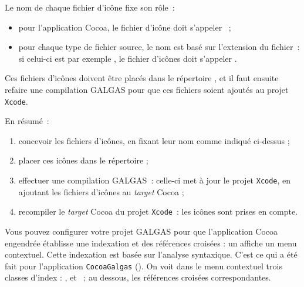 Le nom de chaque fichier d'icône fixe son rôle~:
\begin{itemize}
  \item pour l'application Cocoa, le fichier d'icône doit s'appeler ~;
  \item pour chaque type de fichier source, le nom est basé sur l'extension du fichier~: si celui-ci est par exemple , le fichier d'icônes doit s'appeler .
\end{itemize}

Ces fichiers d'icônes doivent être placés dans le répertoire , et il faut ensuite refaire une compilation GALGAS pour que ces fichiers soient ajoutés au projet \texttt{Xcode}.

En résumé~:
\begin{enumerate}
  \item concevoir les fichiers d'icônes, en fixant leur nom comme indiqué ci-dessus ;
  \item placer ces icônes dans le répertoire  ;
  \item effectuer une compilation GALGAS~: celle-ci met à jour le projet \texttt{Xcode}, en ajoutant les fichiers d'icônes au \emph{target} Cocoa ;
  \item recompiler le \emph{target} Cocoa du projet \texttt{Xcode}~: les icônes sont prises en compte.
\end{enumerate}














Vous pouvez configurer votre projet GALGAS pour que l'application Cocoa engendrée établisse une indexation et des références croisées : un  affiche un menu contextuel. Cette indexation est basée sur l'analyse syntaxique. C'est ce qui a été fait pour l'application \texttt{CocoaGalgas} (). On voit dans le menu contextuel trois classes d'index : ,  et ~; au dessous, les références croisées correspondantes.



